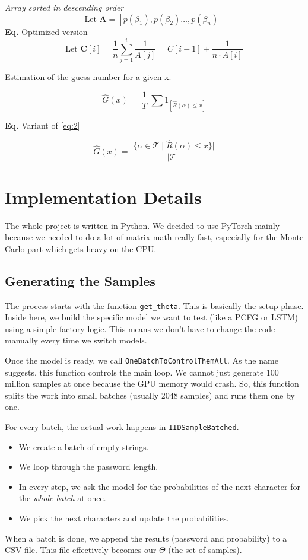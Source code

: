 \documentclass[english,noexaminfo,a4paper,oneside, binding = 0.6cm]{sapthesis}
\begin{document}
\textit{Array sorted in descending order}
\begin{equation}
\label{eq:rhatopt}  
\text{Let } \mathbf{A} = [p(\beta_1),p(\beta_2)\dots,p(\beta_n)]   
\end{equation}  
 \textbf{Eq.} Optimized version
\begin{equation*}
\text{Let } \mathbf{C}[i] = \frac{1}{n}\sum_{j=1}^i \frac{1}{A[j]} = C[i-1] + \frac{1}{n\cdot A[i]}  
\end{equation*}

 Estimation of the guess number for a given x. 

\begin{equation}
\label{eq:2}
\hat{G}(x) = \frac{1}{|T|} \sum 1_{[\hat{R}(\alpha) \le x]}    
\end{equation}


\textbf{Eq.} Variant of \eqref{eq:2}

\begin{equation}
\label{eq:2alt}
\hat{G}(x) = \frac{\big|\{\alpha \in \mathcal{T} \mid \widehat{R}(\alpha) \le x\}\big|}{|\mathcal{T}|} 
\end{equation}


\pagebreak
\section{Implementation Details}

The whole project is written in Python. We decided to use PyTorch mainly because we needed to do a lot of matrix math really fast, especially for the Monte Carlo part which gets heavy on the CPU.

\subsection{Generating the Samples}
The process starts with the function \texttt{get\_theta}. This is basically the setup phase. Inside here, we build the specific model we want to test (like a PCFG or LSTM) using a simple factory logic. This means we don't have to change the code manually every time we switch models.

Once the model is ready, we call \texttt{OneBatchToControlThemAll}. As the name suggests, this function controls the main loop. We cannot just generate 100 million samples at once because the GPU memory would crash. So, this function splits the work into small batches (usually 2048 samples) and runs them one by one.

For every batch, the actual work happens in \texttt{IIDSampleBatched}.
\begin{itemize}
    \item We create a batch of empty strings.
    \item We loop through the password length.
    \item In every step, we ask the model for the probabilities of the next character for the \textit{whole batch} at once.
    \item We pick the next characters and update the probabilities.
\end{itemize}
When a batch is done, we append the results (password and probability) to a CSV file. This file effectively becomes our $\Theta$ (the set of samples).
\end{document}
